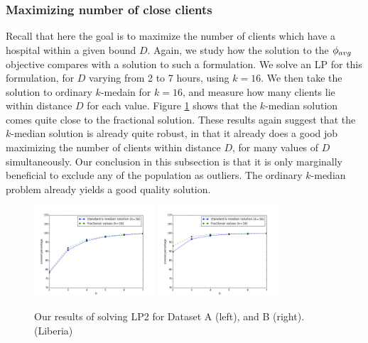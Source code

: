 \subsubsection*{Maximizing number of close clients}
Recall that here the goal is to maximize the number of clients which have a hospital within a given bound $D$.
Again, we study how the solution to the $\phi_{avg}$ objective compares with a solution to such a formulation.
We solve an LP for this formulation, 
for $D$ varying from 2 to 7 hours, using $k=16$. We then take the solution to ordinary $k$-medain for $k=16$, 
and measure how many clients lie within distance $D$ for each value. 
Figure \ref{fig:LP2_AB} shows that the $k$-median solution comes quite close to the fractional solution.
These results again suggest that the $k$-median solution is already quite robust, in that it already does 
a good job maximizing the number of clients within distance $D$, for many values of $D$ simultaneously. 
Our conclusion in this subsection is that it is only marginally beneficial to exclude any of the population as outliers. The ordinary $k$-median problem already yields a good quality solution. 

\begin{figure}[h]
  \centering %
    \includegraphics[width=0.4\textwidth]{figs/plotA16_min_violation.png}
	\includegraphics[width=0.4\textwidth]{figs/plotB16_min_violation.png}
\caption{Our results of solving LP2 for Dataset A (left), and B (right). (Liberia)} 
	\label{fig:LP2_AB}
\end{figure}



